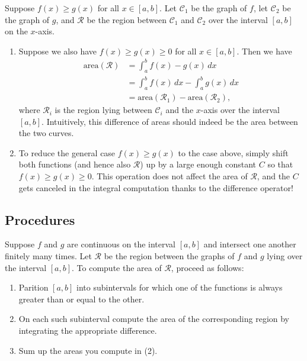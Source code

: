 \begin{namedtheorem} Suppose $f(x)\geq g(x)$ for all $x\in [a,b]$. Let $\mathcal{C}_1$ be the graph of $f$, let $\mathcal{C}_2$ be the graph of $g$, and $\mathcal{R}$ be the region between $\mathcal{C}_1$ and $\mathcal{C}_2$ over the interval $[a,b]$ on the $x$-axis.
  \begin{enumerate}
    \item Suppose we also have $f(x)\geq g(x)\geq 0$ for all $x\in [a,b]$. Then we have
    \begin{align*}
      \text{area}(\mathcal{R})&=\int_a^b f(x)-g(x)\, dx \\
      &=\int_a^b f(x)\, dx -\int_a^bg(x)\, dx\\
      &=\text{area}(\mathcal{R}_1)-\text{area}(\mathcal{R}_2),
    \end{align*}
    where $\mathcal{R}_i$ is the region lying between $\mathcal{C}_i$ and the $x$-axis over the interval $[a,b]$. Intuitively, this difference of areas should indeed be the area between the two curves.
    \item To reduce the general case $f(x)\geq g(x)$ to the case above, simply shift both functions (and hence also $\mathcal{R}$) up by a large enough constant $C$ so that $f(x)\geq g(x)\geq 0$.  This operation does not affect the area of $\mathcal{R}$, and the $C$ gets canceled in the integral computation thanks to the difference operator!
  \end{enumerate}

\end{namedtheorem}

\subsection*{Procedures}
\begin{namedtheorem} Suppose $f$ and $g$ are continuous on the interval $[a,b]$ and intersect one another finitely many times. Let $\mathcal{R}$ be the region between the graphs of $f$ and $g$ lying over the interval $[a,b]$. To compute the area of $\mathcal{R}$, proceed as follows:
  \begin{enumerate}
    \item Parition $[a,b]$ into subintervals for which one of the functions is always greater than or equal to the other.
    \item On each such subinterval compute the area of the corresponding region by integrating the appropriate difference.
    \item Sum up the areas you compute in (2).
  \end{enumerate}


\end{namedtheorem}



